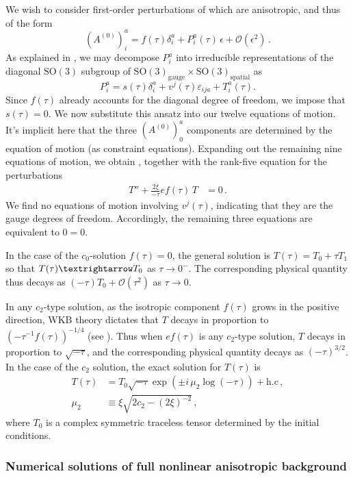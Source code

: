 We wish to consider first-order perturbations of  which are anisotropic, and thus of the form 
\[
(A^{(0)})_{i}^{a}=f(\tau)\delta_{i}^{a}+P_{i}^{a}(\tau)\,\epsilon+\mathcal{O}(\epsilon^{2})\,.
\]
 As explained in , we may decompose $P_{i}^{a}$ into irreducible representations of the diagonal $\mathrm{SO}(3)$ subgroup of $\mathrm{SO}(3)_{\mathrm{gauge}}\times\mathrm{SO}(3)_{\mathrm{spatial}}$ as 
\[
P_{i}^{a}=s(\tau)\delta_{i}^{a}+v^{j}(\tau)\varepsilon_{ija}+T_{i}^{a}(\tau).
\]
 Since $f(\tau)$ already accounts for the diagonal degree of freedom, we impose that $s(\tau)=0$. We now substitute this ansatz into our twelve equations of motion. It's implicit here that the three $(A^{(0)})_{0}^{a}$ components are determined by the equation of motion (as constraint equations). Expanding out the remaining nine equations of motion, we obtain , together with the rank-five equation for the perturbations 
\begin{align*}
T''+\frac{2\xi}{-\tau}ef(\tau)\,T & =0\,.
\end{align*}
We find no equations of motion involving $v^{j}(\tau)$, indicating that they are the gauge degrees of freedom. Accordingly, the remaining three equations are equivalent to $0=0$.

In the case of the $c_{0}$-solution $f(\tau)=0$, the general solution is $T(\tau)=T_{0}+\tau T_{1}$ so that $T(\tau)\textrightarrow T_{0}$ as $\tau\to0^{-}$. The corresponding physical quantity thus decays as $(-\tau)T_{0}+\mathcal{O}(\tau^{2})$ as $\tau\to0$. 

In any $c_{2}$\nobreakdash-type solution, as the isotropic component $f(\tau)$ grows in the positive direction, WKB theory dictates that $T$ decays in proportion to $\left(-\tau^{-1}f(\tau)\right)^{-1/4}$ (see ). Thus when $ef(\tau)$ is any $c_{2}$\nobreakdash-type solution, $T$ decays in proportion to $\sqrt{-\tau}$, and the corresponding physical quantity decays as $(-\tau)^{3/2}$. In the case of the $c_{2}$ solution, the exact solution for $T(\tau)$ is 
\begin{align*}
T(\tau) & =T_{0}\sqrt{-\tau}\exp\left(\pm i\,\mu_{2}\log(-\tau)\right)+\textrm{h.c}\,,\\
\mu_{2} & \equiv\xi\sqrt{2c_{2}-(2\xi)^{-2}}\,,
\end{align*}
where $T_{0}$ is a complex symmetric traceless tensor determined by the initial conditions.

\subsubsection*{Numerical solutions of full nonlinear anisotropic background}


